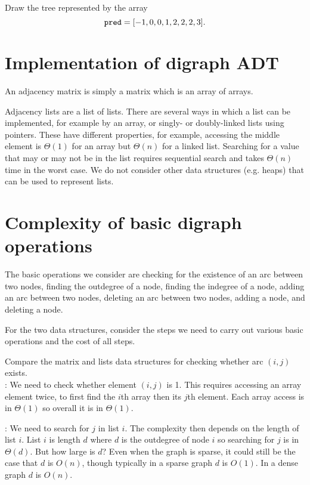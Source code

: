 \begin{Boxample}[4]
Draw the tree represented by the array $$\operatorname{\text{\texttt{pred}}} = [-1,0,0,1,2,2,2,3]\text{.}$$
\end{Boxample}


\section{Implementation of digraph ADT} \label{sec:graphadtimpl}
An adjacency matrix is simply a matrix which is an array of arrays. 

Adjacency lists are a list of lists. 
There are several ways in which a list can be implemented, for
example by an array, or singly- or doubly-linked lists using pointers.  
These have different properties, for example, accessing the middle element is $\Theta(1)$ for an array but $\Theta(n)$ for a linked list. 
Searching for a value that may or may not be in the list requires sequential search
and takes $\Theta(n)$ time in the worst case. 
%
We do not consider other data structures (e.g. heaps) that can be used to represent lists. 

\section{Complexity of basic digraph operations}
The basic operations we consider are checking for the existence of an arc between two nodes, finding the outdegree of a node, 
finding the indegree of a node, adding an arc between two nodes, deleting an arc between two nodes, adding a node, and deleting a node. 

For the two data structures, consider the steps we need to carry out various basic operations and the cost of all steps. 

\begin{Boxample}
Compare the matrix and lists data structures for checking whether arc $(i,j)$ exists.\\
	: 
	We need to check whether element $(i,j)$ is 1. 
	This requires accessing an array element twice, to first find the $i$th array then its $j$th element. 
	Each array access is in $\Theta(1)$ so overall it is in $\Theta(1)$.
	
	: We need to search for $j$ in list $i$. 
	The complexity then depends on the length of list $i$. 
	List $i$ is length $d$ where $d$ is the outdegree of node $i$ so searching for $j$ is in $\Theta(d)$. 
	But how large is $d$? 
	Even when the graph is sparse, it could still be the case that $d$ is $O(n)$,
	though typically in a sparse graph $d$ is $O(1)$.  
	In a dense graph $d$ is $O(n)$.
\end{Boxample}

